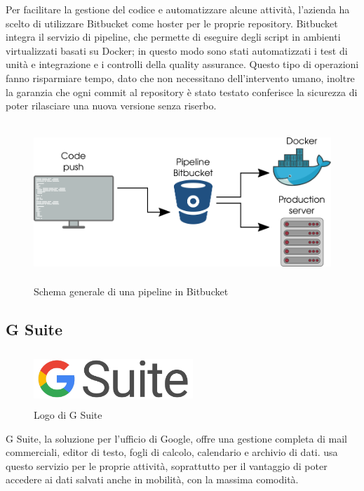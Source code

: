    Per facilitare la gestione del codice e automatizzare alcune attività, l'azienda ha scelto di utilizzare Bitbucket come hoster per le proprie repository. Bitbucket integra il servizio di pipeline, che permette di eseguire degli script in ambienti virtualizzati basati su Docker; in questo modo sono stati automatizzati i test di unità e integrazione e i controlli della quality assurance. Questo tipo di operazioni fanno risparmiare tempo, dato che non necessitano dell'intervento umano, inoltre la garanzia che ogni commit al repository è stato testato conferisce la sicurezza di poter rilasciare una nuova versione senza riserbo.
   \begin{figure}[H]
      \begin{center}
         \includegraphics[width=15cm,height=6cm,keepaspectratio]{immagini/bitbucket-pipeline}
      \end{center}
      \caption{Schema generale di una pipeline in Bitbucket}\label{pipelinebitbucket}
   \end{figure}


   \subsection{G Suite}
   \begin{figure}[H]
      \begin{center}
         \includegraphics[width=6cm,height=2cm,keepaspectratio]{immagini/gsuite-logo}
      \end{center}
      \caption{Logo di G Suite}\label{logogsuite}
   \end{figure}
   G Suite, la soluzione per l'ufficio di Google, offre una gestione completa di mail commerciali, editor di testo, fogli di calcolo, calendario e archivio di dati. \nomeAzienda{} usa questo servizio per le proprie attività, soprattutto per il vantaggio di poter accedere ai dati salvati anche in mobilità, con la massima comodità.

